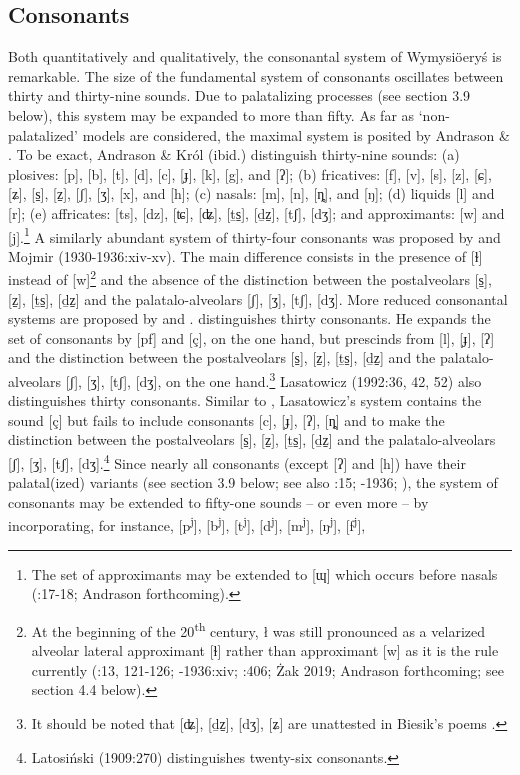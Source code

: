 \documentclass[output=paper]{langscibook}
\begin{document}
\subsection{Consonants}\label{sec:wymsorys:3.7}

Both quantitatively and qualitatively, the consonantal system of Wymysiöeryś is remarkable. The size of the fundamental system of consonants oscillates between thirty and thirty-nine sounds. Due to palatalizing processes (see section 3.9 below), this system may be expanded to more than fifty. As far as ‘non-palatalized’ models are considered, the maximal system is posited by Andrason \& \citet[17-18]{Król2016}. To be exact, Andrason \& Król (ibid.) distinguish thirty-nine sounds: (a) plosives: [p], [b], [t], [d], [c], [ɟ], [k], [g], and [ʔ]; (b) fricatives: [f], [v], [s], [z], [ɕ], [ʑ], [s̠], [z̠], [ʃ], [ʒ], [x], and [h]; (c) nasals: [m], [n], [ȵ], and [ŋ]; (d) liquids [l] and [r]; (e) affricates: [ts], [dz], [ʨ], [ʥ], [ṯs̠], [ḏz̠], [tʃ], [dʒ]; and approximants: [w] and [j].\footnote{The set of approximants may be extended to [ɰ] which occurs before nasals (\citealt{AndrasonKról2016}:17-18; Andrason forthcoming).} A similarly abundant system of thirty-four consonants was proposed by \citet[13-14]{Kleczkowski1920} and Mojmir (1930-1936:xiv-xv). The main difference consists in the presence of [ɫ] instead of [w]\footnote{At the beginning of the 20\textsuperscript{th} century, ł was still pronounced as a velarized alveolar lateral approximant [ɫ] rather than approximant [w] as it is the rule currently (\citealt{Kleczkowski1920}:13, 121-126; \citealt{Mojmir1930}-1936:xiv; \citealt{Wicherkiewicz2003}:406; Żak 2019; Andrason forthcoming; see section 4.4 below).} and the absence of the distinction between the postalveolars [s̠], [z̠], [ṯs̠], [ḏz̠] and the palatalo-alveolars [ʃ], [ʒ], [tʃ], [dʒ]. More reduced consonantal systems are proposed by \citet{Wicherkiewicz2003} and \citet{Lasatowicz1992}. \citet[406-409]{Wicherkiewicz2003} distinguishes thirty consonants. He expands the set of consonants by [pf] and [ç], on the one hand, but prescinds from [l], [ɟ], [ʔ] and the distinction between the postalveolars [s̠], [z̠], [ṯs̠], [ḏz̠] and the palatalo-alveolars [ʃ], [ʒ], [tʃ], [dʒ], on the one hand.\footnote{It should be noted that [ʥ], [ḏz̠], [dʒ], [ʑ] are unattested in Biesik’s poems \citep[408-409]{Wicherkiewicz2003}.} Lasatowicz (1992:36, 42, 52) also distinguishes thirty consonants. Similar to \citet{Wicherkiewicz2003}, Lasatowicz’s system contains the sound [ç] but fails to include consonants [c], [ɟ], [ʔ], [ȵ] and to make the distinction between the postalveolars [s̠], [z̠], [ṯs̠], [ḏz̠] and the palatalo-alveolars [ʃ], [ʒ], [tʃ], [dʒ].\footnote{Latosiński (1909:270) distinguishes twenty-six consonants.} Since nearly all consonants (except [ʔ] and [h]) have their palatal(ized) variants (see section 3.9 below; see also \citealt{Kleczkowski1920}:15; \citealt{Mojmir1930}-1936; \citealt{AndrasonKról2016}), the system of consonants may be extended to fifty-one sounds – or even more – by incorporating, for instance, [p\textsuperscript{j}], [b\textsuperscript{j}], [t\textsuperscript{j}], [d\textsuperscript{j}], [m\textsuperscript{j}], [ŋ\textsuperscript{j}], [f\textsuperscript{j}], 
\end{document}
